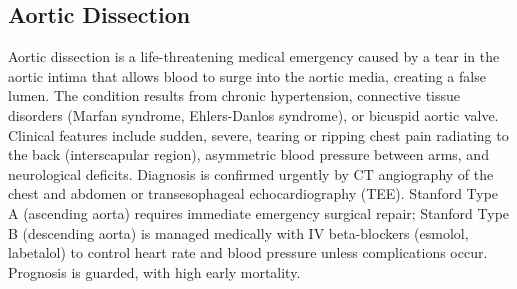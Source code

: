 






\label{sec:Valvular Heart Disease}

\subsection{Aortic Dissection}
\label{sec:Aortic Dissection}
Aortic dissection is a life-threatening medical emergency caused by a tear in the aortic intima that allows blood to surge into the aortic media, creating a false lumen. The condition results from chronic hypertension, connective tissue disorders (Marfan syndrome, Ehlers-Danlos syndrome), or bicuspid aortic valve. Clinical features include sudden, severe, tearing or ripping chest pain radiating to the back (interscapular region), asymmetric blood pressure between arms, and neurological deficits. Diagnosis is confirmed urgently by CT angiography of the chest and abdomen or transesophageal echocardiography (TEE). Stanford Type A (ascending aorta) requires immediate emergency surgical repair; Stanford Type B (descending aorta) is managed medically with IV beta-blockers (esmolol, labetalol) to control heart rate and blood pressure unless complications occur. Prognosis is guarded, with high early mortality.

